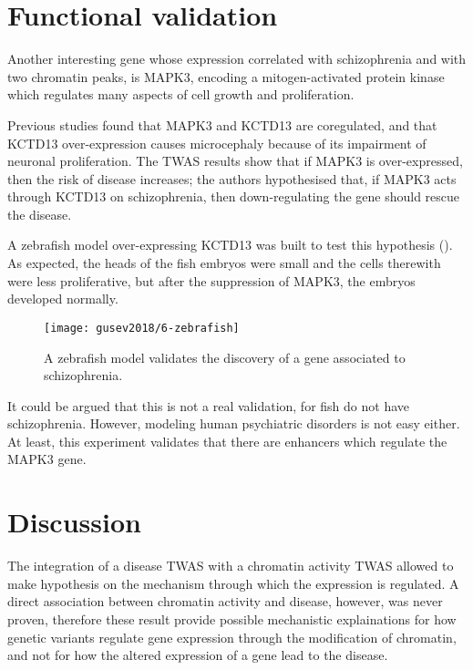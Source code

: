 \documentclass[../main.tex]{subfiles}
\begin{document}
\section{Functional validation}

Another interesting gene whose expression correlated with schizophrenia 
and with two chromatin peaks, is MAPK3, encoding a mitogen-activated 
protein kinase which regulates many aspects of cell growth and 
proliferation. 

Previous studies found that MAPK3 and KCTD13 are coregulated, and that 
KCTD13 over-expression causes microcephaly because of its impairment of 
neuronal proliferation. The TWAS results show that if MAPK3 is 
over-expressed, then the risk of disease increases; the authors 
hypothesised that, if MAPK3 acts through KCTD13 on schizophrenia, then 
down-regulating the gene should rescue the disease.

A zebrafish model over-expressing KCTD13 was built to test this 
hypothesis (). As expected, the heads of the fish 
embryos were small and the cells therewith were less proliferative, but 
after the suppression of MAPK3, the embryos developed normally.

\begin{figure}
	\texttt{[image: gusev2018/6-zebrafish]}
	\caption{A zebrafish model validates the discovery of a gene 
associated to schizophrenia.}
\end{figure}

It could be argued that this is not a real validation, for fish do not 
have schizophrenia. However, modeling human psychiatric disorders is not 
easy either. At least, this experiment validates that there are 
enhancers which regulate the MAPK3 gene.

\section{Discussion}

The integration of a disease TWAS with a chromatin activity TWAS allowed 
to make hypothesis on the mechanism through which the expression is 
regulated. A direct association between chromatin activity and disease, 
however, was never proven, therefore these result 
provide possible mechanistic explainations for how genetic variants 
regulate gene expression through the modification of chromatin, and not 
for how the altered expression of a gene lead to the disease.
\end{document}
